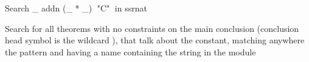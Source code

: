 \begin{landscape}
\begin{small}
\begin{multicols*}{3}[\begin{center}\section*{}\end{center}]
\begin{cheat}
Search _ addn (_ * _)$\;$ "C"$\;$ in ssrnat
\end{cheat}
  Search for all theorems with no constraints on
  the main conclusion (conclusion head symbol is the wildcard \C{_}),
  that talk about the  constant, matching anywhere the pattern
  \C{(_ * _)} and having a name containing the string  in the
  module 

% 
% 

\end{multicols*}
\end{small}
\end{landscape}
